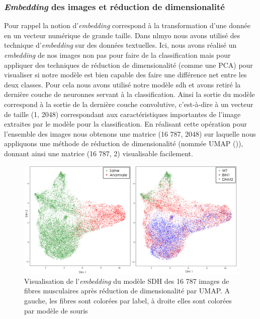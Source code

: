 \subsubsection{\textit{Embedding} des images et réduction de dimensionalité} 
Pour rappel la notion d'\textit{embedding} correspond  à la transformation d'une donnée en un vecteur numérique de grande taille. Dans \gls{nlmyo} nous avons utilisé des technique d'\textit{embedding} sur des données textuelles. Ici, nous avons réalisé un \textit{embedding} de nos images non pas pour faire de la classification mais pour appliquer des techniques de réduction de dimensionalité (comme une PCA) pour visualiser si notre modèle est bien capable des faire une différence net entre les deux classes.
Pour cela nous avons utilisé notre modèle \gls{sdh} et avons retiré la dernière couche de neuronnes servant à la classification. Ainsi la sortie du modèle correspond à la sortie de la dernière couche convolutive, c'est-à-dire à un vecteur de taille (1, 2048) correspondant aux caractéristiques importantes de l'image extraites par le modèle pour la classification.  En réalisant cette opération pour l'ensemble des images nous obtenons une matrice (16 787, 2048) sur laquelle nous appliquons une méthode de réduction de dimensionalité (nommée UMAP (\cite{mcinnes_umap_2020})), donnant ainsi une matrice (16 787, 2) visualisable facilement.
\begin{figure}[htbp]
 \centering
 \includegraphics[width=1\textwidth]{figures/umap_sdh.png}
 \caption[Visualisation de l'\textit{embedding} du modèle SDH]{Visualisation de l'\textit{embedding} du modèle SDH des 16 787 images de fibres musculaires après réduction de dimensionalité par UMAP. A gauche, les fibres sont colorées par label, à droite elles sont colorées par modèle de souris}
 \label{fig:umap_sdh}
\end{figure}

